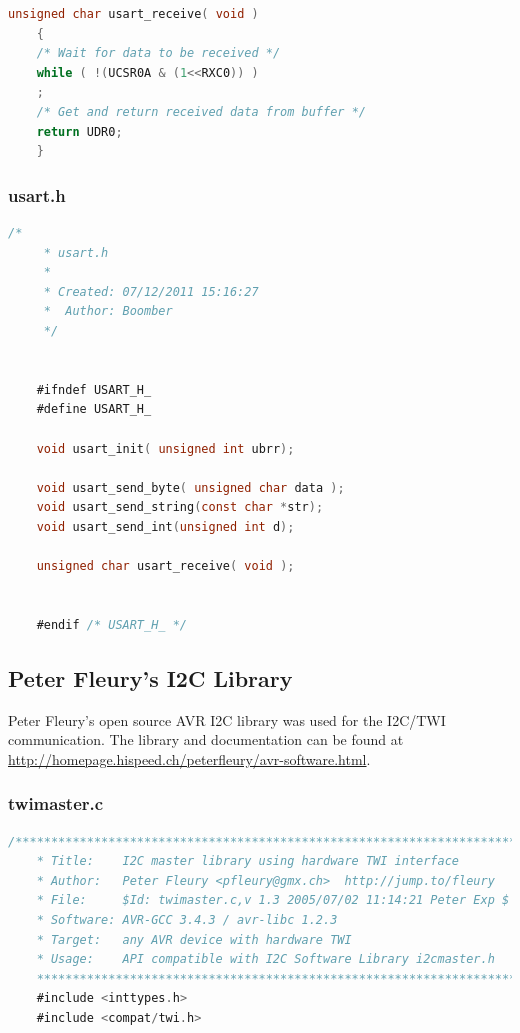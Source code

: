 \documentclass{article}
\numberwithin{figure}{section}
\numberwithin{equation}{section}
\begin{document}
{\begin{lstlisting}[language=C,label=lst:usart.c,caption=usart.c]
    unsigned char usart_receive( void )
    {
    /* Wait for data to be received */
    while ( !(UCSR0A & (1<<RXC0)) )
    ;
    /* Get and return received data from buffer */
    return UDR0;
    }
\end{lstlisting}

\subsubsection{usart.h}\label{sect:usart.h}
\begin{lstlisting}[language=C,label=lst:usart.h,caption=usart.h]
    /*
     * usart.h
     *
     * Created: 07/12/2011 15:16:27
     *  Author: Boomber
     */


    #ifndef USART_H_
    #define USART_H_

    void usart_init( unsigned int ubrr);

    void usart_send_byte( unsigned char data );
    void usart_send_string(const char *str);
    void usart_send_int(unsigned int d);

    unsigned char usart_receive( void );


    #endif /* USART_H_ */
\end{lstlisting}

\subsection{Peter Fleury's I2C Library}\label{sect:sect:fleury-source}
Peter Fleury's open source AVR I2C library was used for the I2C/TWI communication. The library and documentation can be found at \href{http://homepage.hispeed.ch/peterfleury/avr-software.html}{http://homepage.hispeed.ch/peterfleury/avr-software.html}.
\subsubsection{twimaster.c}\label{sect:twimaster.c}
\begin{lstlisting}[language=C,label=lst:twimaster.c,caption=twimaster.c]
    /*************************************************************************
    * Title:    I2C master library using hardware TWI interface
    * Author:   Peter Fleury <pfleury@gmx.ch>  http://jump.to/fleury
    * File:     $Id: twimaster.c,v 1.3 2005/07/02 11:14:21 Peter Exp $
    * Software: AVR-GCC 3.4.3 / avr-libc 1.2.3
    * Target:   any AVR device with hardware TWI
    * Usage:    API compatible with I2C Software Library i2cmaster.h
    **************************************************************************/
    #include <inttypes.h>
    #include <compat/twi.h>


\end{lstlisting}}
\end{document}
